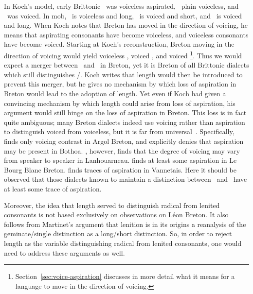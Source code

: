 In Koch's model, early Brittonic \xT\ was voiceless aspirated, \lT\ plain voiceless, and \xD\ was voiced. In \gls{mob}, \xT\ is voiceless and long, \lT\ is voiced and short, and \xD\ is voiced and long. When Koch notes that Breton has moved in the direction of voicing, he means that aspirating consonants have become voiceless, and voiceless consonants have become voiced. Starting at Koch's reconstruction, Breton moving in the direction of voicing would yield voiceless \xT, voiced \lT, and voiced \xD\footnote{Section~\ref{sec:voice-aspiration} discusses in more detail what it means for a language to move in the direction of voicing.}. Thus we would expect a merger between \lT\ and \xD\ in Breton, yet it is Breton  of all Brittonic dialects which still distinguishes \lT/\xD. Koch writes that length would then be introduced to prevent this merger, but he gives no mechanism by which loss of aspiration in Breton would lead to the adoption of length. Yet even if Koch had given a convincing mechanism by which length could arise from loss of aspiration, his argument would still hinge on the loss of aspiration in Breton. This loss is in fact quite ambiguous; many Breton dialects indeed use voicing rather than aspiration to distinguish voiced from voiceless, but it is far from universal~\autocite[221]{Ios_Representation13}. Specifically, \Textcite[114]{Bot_Etude82} finds only voicing contrast in Argol Breton, and \textcite[177--178]{Hum_Phonologie95} explicitly denies that aspiration may be present in Bothoa.  \Textcite[9]{carlyle_syllabic_1988}, however, finds that the degree of voicing may vary from speaker to speaker in Lanhouarneau. \Textcite[157--167]{falchun_systeme_1951} finds at least some aspiration in  Le Bourg Blanc Breton. \Textcite{Ter_Grammaire70} finds traces of aspiration in Vannetais. Here it should be observed that those dialects known to maintain a distinction between  \lT\ and \xD\ have at least some trace of aspiration.

Moreover, the idea that length served to distinguish radical from lenited consonants is not based exclusively on observations on Léon Breton. It also follows from Martinet's argument that lenition is in its origins a reanalysis of the geminate/single distinction as a long/short distinction. So, in order to reject length as the variable distinguishing radical from lenited consonants, one would need to address these arguments as well. 

